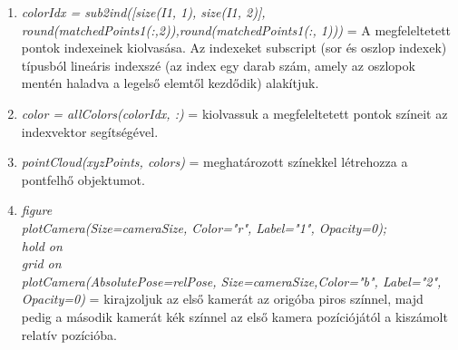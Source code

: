 \documentclass[12pt]{report}
\begin{document}
\begin{enumerate}
                        \item \textit{colorIdx = sub2ind([size(I1, 1), size(I1, 2)], round(matchedPoints1(:,2)),round(matchedPoints1(:, 1)))} = A megfeleltetett pontok indexeinek kiolvasása. Az indexeket subscript (sor és oszlop indexek) típusból lineáris indexszé (az index egy darab szám, amely az oszlopok mentén haladva a legelső elemtől kezdődik) alakítjuk.
                        \item \textit{color = allColors(colorIdx, :)} = kiolvassuk a megfeleltetett pontok színeit az indexvektor segítségével.
                        \item \textit{pointCloud(xyzPoints, colors)} = meghatározott színekkel létrehozza a pontfelhő objektumot.
                        \item \textit{figure\\
                                      plotCamera(Size=cameraSize, Color="r", Label="1", Opacity=0);\\
                                      hold on\\
                                      grid on\\
                                      plotCamera(AbsolutePose=relPose, Size=cameraSize,Color="b", Label="2", Opacity=0)} = kirajzoljuk az első kamerát az origóba piros színnel, majd pedig a második kamerát kék színnel az első kamera pozíciójától a kiszámolt relatív pozícióba.
                \end{enumerate}
\end{document}

